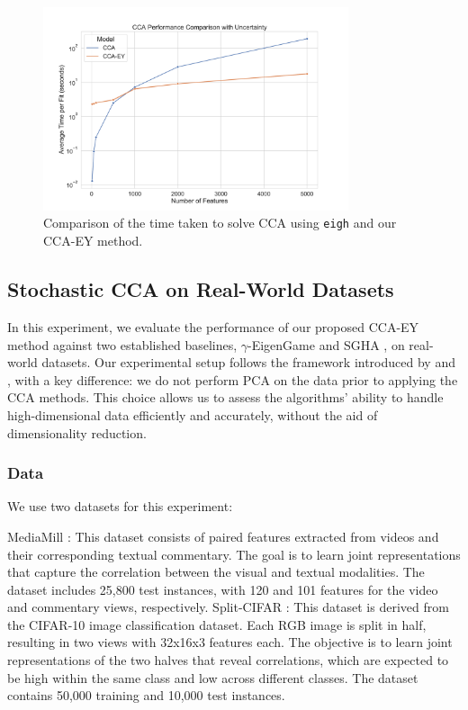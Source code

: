 \begin{figure}
    \centering
    \includegraphics[width=0.8\textwidth]{figures/benchmarks/cca_comparison_log}
    \caption{Comparison of the time taken to solve CCA using \texttt{eigh} and our CCA-EY method.}
    \label{fig:cca-comparison}
\end{figure}

\subsection{Stochastic CCA on Real-World Datasets}
In this experiment, we evaluate the performance of our proposed CCA-EY method against two established baselines, $\gamma$-EigenGame \citep{gemp2022generalized} and SGHA \citep{chen2019constrained}, on real-world datasets. Our experimental setup follows the framework introduced by \citet{meng2021online} and \citet{gemp2022generalized}, with a key difference: we do not perform PCA on the data prior to applying the CCA methods. This choice allows us to assess the algorithms' ability to handle high-dimensional data efficiently and accurately, without the aid of dimensionality reduction.
\subsubsection{Data}
We use two datasets for this experiment:

MediaMill \citep{gemert2008visual}: This dataset consists of paired features extracted from videos and their corresponding textual commentary. The goal is to learn joint representations that capture the correlation between the visual and textual modalities. The dataset includes 25,800 test instances, with 120 and 101 features for the video and commentary views, respectively.
Split-CIFAR \citep{meng2021online}: This dataset is derived from the CIFAR-10 image classification dataset. Each RGB image is split in half, resulting in two views with 32x16x3 features each. The objective is to learn joint representations of the two halves that reveal correlations, which are expected to be high within the same class and low across different classes. The dataset contains 50,000 training and 10,000 test instances.

